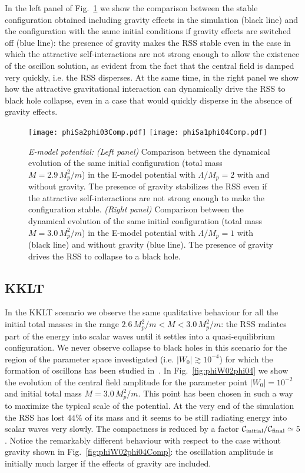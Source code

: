\documentclass[11pt,a4paper]{article}
\begin{document}
In the left panel of Fig.~\ref{fig:phiSa2phi03Comp} we show the comparison between the stable configuration obtained including gravity effects in the simulation (black line) and the configuration with the same initial conditions if gravity effects are switched off (blue line): the presence of gravity makes the RSS stable even in the case in which the attractive self-interactions are not strong enough to allow the existence of the oscillon solution, as evident from the fact that the central field is damped very quickly, i.e. the RSS disperses. At the same time, in the right panel we show how the attractive gravitational interaction can dynamically drive the RSS to black hole collapse, even in a case that would quickly disperse in the absence of gravity effects.

\begin{figure}[h!]
    \centering
    \texttt{[image: phiSa2phi03Comp.pdf]}
    \texttt{[image: phiSa1phi04Comp.pdf]}
    \caption{{\it E-model potential: }\textit{(Left panel)} Comparison between the dynamical evolution of the same initial configuration (total mass $M = 2.9 \, M_p^2/m$) in the E-model potential with $\Lambda/M_p = 2$ with and without gravity. The presence of gravity stabilizes the RSS even if the attractive self-interactions are not strong enough to make the configuration stable. \textit{(Right panel)} Comparison between the dynamical evolution of the same initial configuration (total mass $M = 3.0 \, M_p^2/m$) in the E-model potential with $\Lambda/M_p = 1$ with (black line) and without gravity (blue line). The presence of gravity drives the RSS to collapse to a black hole.}
\label{fig:phiSa2phi03Comp}
\end{figure}

\subsection{KKLT}

In the KKLT scenario we observe the same qualitative behaviour for all the initial total masses in the range $2.6 \, M_p^2/m < M < 3.0 \, M_p^2/m$: the RSS radiates part of the energy into scalar waves until it settles into a quasi-equilibrium configuration. We never observe collapse to black holes in this scenario for the region of the parameter space investigated (i.e. $|W_0| \gtrsim 10^{-4}$) for which the formation of oscillons has been studied in~\cite{Antusch:2017flz}. In Fig.~\ref{fig:phiW02phi04} we show the evolution of the central field amplitude for the parameter point $|W_0| = 10^{-2}$ and initial total mass $M = 3.0 \, M_p^2/m$. This point has been chosen in such a way to maximize the typical scale of the potential. At the very end of the simulation the RSS has lost $44\%$ of its mass and it seems to be still radiating energy into scalar waves very slowly. The compactness is reduced by a factor $\mathcal{C}_{\rm initial}/\mathcal{C}_{\rm final} \simeq 5$. Notice the remarkably different behaviour with respect to the case without gravity shown in Fig.~\ref{fig:phiW02phi04Comp}: the oscillation amplitude is initially much larger if the effects of gravity are included. 
\end{document}
